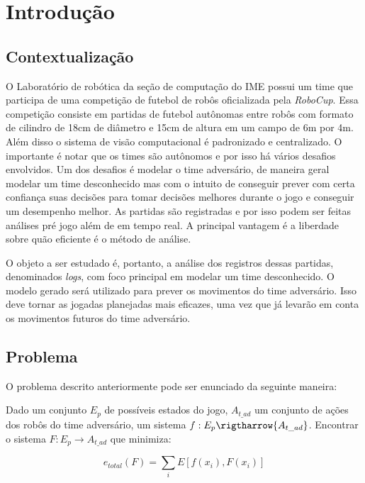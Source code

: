 \chapter{Introdução}

\section{Contextualização}

\par O Laboratório de robótica da seção de computação do IME possui um time que
participa de uma competição de futebol de robôs oficializada pela \textit{RoboCup}.
Essa competição consiste em partidas de futebol autônomas entre robôs com formato
de cilindro de 18cm de diâmetro e 15cm de altura em um campo de 6m por 4m. Além disso
o sistema de visão computacional é padronizado e centralizado. O importante é notar
que os times são autônomos e por isso há vários desafios envolvidos.
Um dos desafios é modelar o time adversário, de maneira geral modelar um time desconhecido
mas com o intuito de conseguir prever com certa confiança suas decisões para tomar
decisões melhores durante o jogo e conseguir um desempenho melhor.
As partidas são registradas e por isso podem ser feitas análises pré jogo além
de em tempo real. A principal vantagem é a liberdade sobre quão eficiente é o método
de análise.

\par O objeto a ser estudado é, portanto, a análise dos registros dessas partidas,
denominados \textit{logs}, com foco principal em modelar um time desconhecido. O modelo 
gerado será utilizado para prever os movimentos do time adversário. Isso deve tornar 
as jogadas planejadas mais  eficazes, uma vez que já levarão em conta os movimentos 
futuros do time adversário.

\section{Problema}

O problema descrito anteriormente pode ser enunciado da seguinte maneira:

Dado um conjunto $E_p$ de possíveis estados do jogo, $A_{t\_ad}$ um conjunto de ações dos robôs
do time adversário, um sistema $f: {E_p} \rigtharrow {A_{t\_ad}}$. Encontrar o sistema 
$F: {E_p} \rightarrow {A_{t\_ad}}$ que minimiza:

\begin{equation}
e_{total}(F) = \sum_i E[f(x_i),F(x_i)]
\end{equation}

